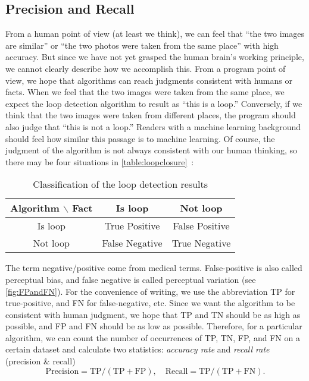 \subsection{Precision and Recall}
From a human point of view (at least we think), we can feel that ``the two images are similar'' or ``the two photos were taken from the same place'' with high accuracy. But since we have not yet grasped the human brain's working principle, we cannot clearly describe how we accomplish this. From a program point of view, we hope that algorithms can reach judgments consistent with humans or facts. When we feel that the two images were taken from the same place, we expect the loop detection algorithm to result as ``this is a loop.'' Conversely, if we think that the two images were taken from different places, the program should also judge that ``this is not a loop.'' Readers with a machine learning background should feel how similar this passage is to machine learning.  Of course, the judgment of the algorithm is not always consistent with our human thinking, so there may be four situations in \autoref{table:loopclosure}~:

\begin{table}[!htp]
	\centering
	\caption{Classification of the loop detection results}
	\label{table:loopclosure}
	\begin{tabu}{c|c|c}
		\toprule
		Algorithm $\backslash$ Fact & Is loop & Not loop\\ 
		\midrule
		Is loop & True Positive & False Positive \\ 
		Not loop & False Negative & True Negative\\ 
		\bottomrule
	\end{tabu} 
\end{table}

The term negative/positive come from medical terms. False-positive is also called perceptual bias, and false negative is called perceptual variation (see \autoref{fig:FPandFN}). For the convenience of writing, we use the abbreviation TP for true-positive, and FN for false-negative, etc. Since we want the algorithm to be consistent with human judgment, we hope that TP and TN should be as high as possible, and FP and FN should be as low as possible. Therefore, for a particular algorithm, we can count the number of occurrences of TP, TN, FP, and FN on a certain dataset and calculate two statistics: \textit{accuracy rate} and \textit{recall rate} (precision \& recall)
\begin{equation}
	\mathrm{Precision} = \mathrm{TP}/(\mathrm{TP}+\mathrm{FP}), \quad \mathrm{Recall} = \mathrm{TP}/(\mathrm{TP}+\mathrm{FN}).
\end{equation}

